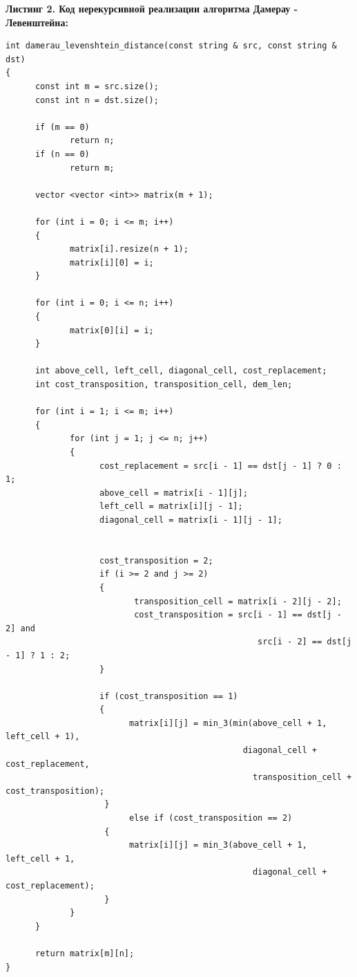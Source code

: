 \documentclass{article}
\begin{document}
\newpage
\small \textbf{Листинг 2. Код нерекурсивной реализации алгоритма Дамерау - Левенштейна:} \normalsize
\begin{verbatim}
int damerau_levenshtein_distance(const string & src, const string & dst)
{
      const int m = src.size();
      const int n = dst.size();

      if (m == 0)
             return n;
      if (n == 0)
             return m;

      vector <vector <int>> matrix(m + 1);

      for (int i = 0; i <= m; i++)
      {
             matrix[i].resize(n + 1);
             matrix[i][0] = i;
      }

      for (int i = 0; i <= n; i++)
      {
             matrix[0][i] = i;
      }

      int above_cell, left_cell, diagonal_cell, cost_replacement;
      int cost_transposition, transposition_cell, dem_len;

      for (int i = 1; i <= m; i++)
      {
             for (int j = 1; j <= n; j++)
             {
                   cost_replacement = src[i - 1] == dst[j - 1] ? 0 : 1;
                   above_cell = matrix[i - 1][j];
                   left_cell = matrix[i][j - 1];
                   diagonal_cell = matrix[i - 1][j - 1];


                   cost_transposition = 2;
                   if (i >= 2 and j >= 2)
                   {
                          transposition_cell = matrix[i - 2][j - 2];
                          cost_transposition = src[i - 1] == dst[j - 2] and 
                                                   src[i - 2] == dst[j - 1] ? 1 : 2;
                   }

                   if (cost_transposition == 1)
                   {
                         matrix[i][j] = min_3(min(above_cell + 1, left_cell + 1), 
                                                diagonal_cell + cost_replacement, 
                                                  transposition_cell + cost_transposition);
                    }
                         else if (cost_transposition == 2)
                    {
                         matrix[i][j] = min_3(above_cell + 1, left_cell + 1,
                                                  diagonal_cell + cost_replacement);
                    }
             }
      }

      return matrix[m][n];
}

\end{verbatim}
\end{document}

